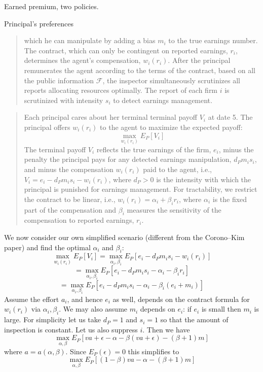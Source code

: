 \begin{example}{Earned premium, two policies.}
\begin{example}{Principal's preferences}
\begin{quote}
			which he can manipulate by adding a bias $m_i$ to the true earnings number.
			The contract, which can only be contingent on reported earnings, $r_i$, determines the agent’s compensation, $w_i(r_i)$.
			After the principal remunerates the agent according to the terms of the contract, based on all the public information $\mathscr F$,
			the inspector simultaneously scrutinizes all reports allocating resources optimally. The report of each firm $i$ is scrutinized with intensity $s_i$
			to detect earnings management. 
		\end{quote}
		\begin{quote}
		Each principal cares about her terminal terminal payoff $V_i$ at date 5. The principal offers $w_i (r_i)$ to the agent to maximize the expected payoff:
		\[
			\max_{w_i(r_i)} E_P[V_i]
		\]
		The terminal payoff $V_i$ reflects the true earnings of the firm, $e_i$, minus the penalty the principal pays for any detected earnings manipulation, $d_Pm_is_i$,
		and minus the compensation $w_i(r_i)$ paid to the agent, i.e., $V_i = e_i - d_Pm_is_i - w_i(r_i)$,
		where $d_P > 0$ is the intensity with which the principal is punished for earnings management.
		For tractability, we restrict the contract to be linear, i.e., $w_i(r_i) = \alpha_i +\beta_ir_i$,
		where $\alpha_i$ is the fixed part of the compensation and
		$\beta_i$ measures the sensitivity of the compensation to reported earnings, $r_i$.
		\end{quote}
		We now consider our own simplified scenario (different from the Corono--Kim paper) and find the  optimal $\alpha_i$ and $\beta_i$:
		\[
			\max_{w_i(r_i)} E_P[V_i] = \max_{\alpha_i,\beta_i} E_P[e_i - d_Pm_is_i - w_i(r_i)]
		\]
		\[
			= \max_{\alpha_i,\beta_i} E_P[e_i - d_Pm_is_i - \alpha_i - \beta_i r_i]
		\]
		\[
			= \max_{\alpha_i,\beta_i} E_P[e_i - d_Pm_is_i - \alpha_i - \beta_i (e_i+m_i)]
		\]
		Assume the effort $a_i$, and hence $e_i$ as well, depends on the contract formula for $w_i(r_i)$ via $\alpha_i,\beta_i$.
		We may also assume $m_i$ depends on $e_i$: if $e_i$ is small then $m_i$ is large.
		For simplicity let us take $d_P=1$ and $s_i=1$ so that the amount of inspection is constant.
		Let us also suppress $i$.
		Then we have
		\[
			\max_{\alpha,\beta} E_P[ va+\epsilon - \alpha - \beta (va+\epsilon) - (\beta+1)m]
		\]
		where $a=a(\alpha,\beta)$.
		Since $E_P(\epsilon)=0$ this simplifies to
		\[
			\max_{\alpha,\beta} E_P[ (1-\beta)va - \alpha - (\beta+1)m]
		\]

\end{example}
\end{example}
